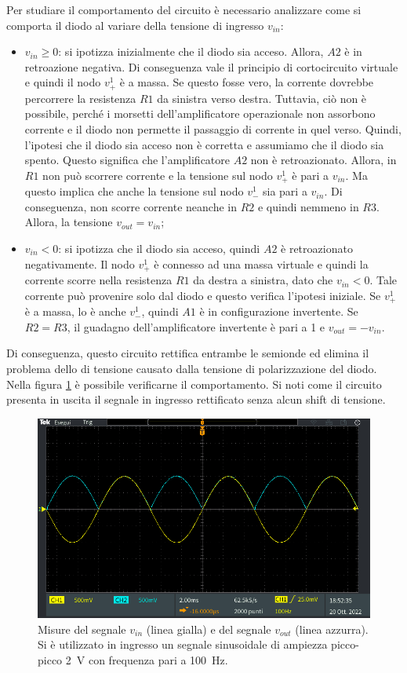 \noindent
Per studiare il comportamento del circuito è necessario analizzare come si comporta il diodo al variare della tensione di ingresso $v_{in}$:
\begin{itemize}
	\item $v_{in} \geq 0$: si ipotizza inizialmente che il diodo sia acceso. Allora, $A2$  è in retroazione negativa. Di conseguenza vale il principio di cortocircuito virtuale e quindi il nodo $v_{+}^1$ è a massa. Se questo fosse vero, la corrente dovrebbe percorrere la resistenza $R1$ da sinistra verso destra. Tuttavia, ciò non è possibile, perché i morsetti dell'amplificatore operazionale non assorbono corrente e il diodo non permette il passaggio di corrente in quel verso. Quindi, l'ipotesi che il diodo sia acceso non è corretta e assumiamo che il diodo sia spento. Questo significa che l'amplificatore $A2$ non è retroazionato. Allora, in $R1$ non può scorrere corrente e la tensione sul nodo $v_{+}^1$ è pari a $v_{in}$. Ma questo implica che anche la tensione sul nodo $v_{-}^1$ sia pari a $v_{in}$. Di conseguenza, non scorre corrente neanche in $R2$ e quindi nemmeno in $R3$. Allora, la tensione $v_{out} = v_{in}$;
	\item $v_{in} < 0$: si ipotizza che il diodo sia acceso, quindi $A2$ è retroazionato negativamente. Il nodo $v_{+}^1$ è connesso ad una massa virtuale e quindi la corrente scorre nella resistenza $R1$ da destra a sinistra, dato che $v_{in} < 0$. Tale corrente può provenire solo dal diodo e questo verifica l'ipotesi iniziale. Se $v_{+}^1$ è a massa, lo è anche $v_{-}^1$, quindi $A1$ è in configurazione invertente. Se $R2 = R3$, il guadagno dell'amplificatore invertente è pari a 1 e $v_{out} = -v_{in}$.
\end{itemize}
Di conseguenza, questo circuito rettifica entrambe le semionde ed elimina il problema dello  di tensione causato dalla tensione di polarizzazione del diodo. Nella figura \ref{fig:uscita_circuito_1} è possibile verificarne il comportamento. Si noti come il circuito presenta in uscita il segnale in ingresso rettificato senza alcun shift di tensione. 
\begin{figure}[h]
	\centering
	\includegraphics[width=\linewidth]{./ImageFiles/Laboratorio 3/TEK00001.PNG}
	\caption{Misure del segnale $v_{in}$ (linea gialla) e del segnale $v_{out}$ (linea azzurra). Si è utilizzato in ingresso un segnale sinusoidale di ampiezza picco-picco \SI{2}{\volt} con frequenza pari a \SI{100}{\hertz}.}
	\label{fig:uscita_circuito_1}
\end{figure}

